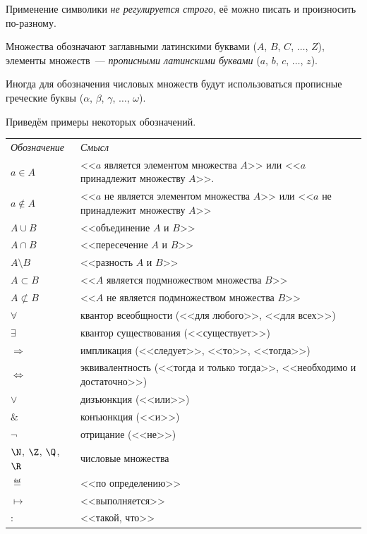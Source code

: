 \setcounter{section}{-1}

Применение символики \textit{не регулируется строго}, её можно писать и произносить
по-разному.  

Множества обозначают заглавными латинскими буквами (\(A\), \(B\), \(C\), \(\dots\), \(Z\)),
элементы множеств~--- \textit{прописными латинскими буквами}
(\(a\), \(b\), \(c\), \(\dots\), \(z\)).

Иногда для обозначения числовых множеств будут использоваться прописные греческие
буквы (\(\alpha\), \(\beta\), \(\gamma\), \(\dots\), \(\omega\)).

Приведём примеры некоторых обозначений.

\vspace{-8pt}
\begin{table}[H]
\begin{tabular}{ll}
\textit{Обозначение} & \textit{Смысл}\\
\(a \in A\) & <<\(a\) является элементом множества \(A\)>> или <<\(a\) принадлежит множеству
    \(A\)>>.\\
\(a \notin A\) & <<\(a\) не является элементом множества \(A\)>> или <<\(a\) не принадлежит
    множеству \(A\)>>\\
\(A \cup B\) & <<объединение \(A\) и \(B\)>>\\
\(A \cap B\) & <<пересечение \(A\) и \(B\)>>\\
\(A \setminus B\) & <<разность \(A\) и \(B\)>>\\
\(A \subset B\) & <<\(A\) является подмножеством множества \(B\)>>\\
\(A \not\subset B\) & <<\(A\) не является подмножеством множества \(B\)>>\\
\(\forall\) & квантор всеобщности (<<для любого>>, <<для всех>>)\\
\(\exists\) & квантор существования (<<существует>>)\\
\(\Rightarrow\) & импликация (<<следует>>, <<то>>, <<тогда>>)\\
\(\Leftrightarrow\) & эквивалентность (<<тогда и только тогда>>, <<необходимо и достаточно>>)\\
\(\lor\) & дизъюнкция (<<или>>)\\
\(\&\) & конъюнкция (<<и>>)\\
\(\neg\) & отрицание (<<не>>)\\
\(\N\), \(\Z\), \(\Q\), \(\R\) & числовые множества \\
\(\eqdef\) & <<по определению>> \\
\(\mapsto\) & <<выполняется>> \\
\(\colon\) & <<такой, что>> \\
\end{tabular}
\end{table}
\vspace{-14pt}

